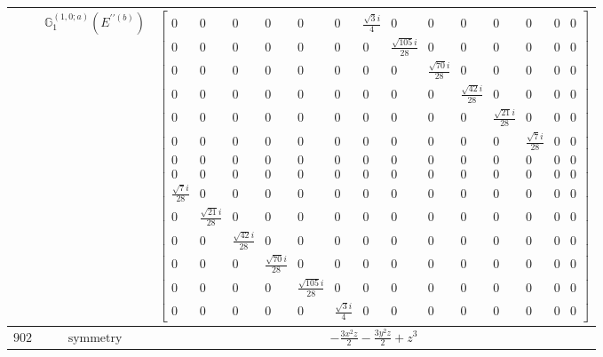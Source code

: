 \documentclass[fleqn,8pt,landscape]{jsarticle}
\begin{document}
\begin{longtable}{ccc}
$  $ & $ \mathbb{G}_{1}^{(1,0;a)}(E^{\prime\prime(b)}) $ & $ \begin{bmatrix} 0 & 0 & 0 & 0 & 0 & 0 & \frac{\sqrt{3} i}{4} & 0 & 0 & 0 & 0 & 0 & 0 & 0 \\ 0 & 0 & 0 & 0 & 0 & 0 & 0 & \frac{\sqrt{105} i}{28} & 0 & 0 & 0 & 0 & 0 & 0 \\ 0 & 0 & 0 & 0 & 0 & 0 & 0 & 0 & \frac{\sqrt{70} i}{28} & 0 & 0 & 0 & 0 & 0 \\ 0 & 0 & 0 & 0 & 0 & 0 & 0 & 0 & 0 & \frac{\sqrt{42} i}{28} & 0 & 0 & 0 & 0 \\ 0 & 0 & 0 & 0 & 0 & 0 & 0 & 0 & 0 & 0 & \frac{\sqrt{21} i}{28} & 0 & 0 & 0 \\ 0 & 0 & 0 & 0 & 0 & 0 & 0 & 0 & 0 & 0 & 0 & \frac{\sqrt{7} i}{28} & 0 & 0 \\ 0 & 0 & 0 & 0 & 0 & 0 & 0 & 0 & 0 & 0 & 0 & 0 & 0 & 0 \\ 0 & 0 & 0 & 0 & 0 & 0 & 0 & 0 & 0 & 0 & 0 & 0 & 0 & 0 \\ \frac{\sqrt{7} i}{28} & 0 & 0 & 0 & 0 & 0 & 0 & 0 & 0 & 0 & 0 & 0 & 0 & 0 \\ 0 & \frac{\sqrt{21} i}{28} & 0 & 0 & 0 & 0 & 0 & 0 & 0 & 0 & 0 & 0 & 0 & 0 \\ 0 & 0 & \frac{\sqrt{42} i}{28} & 0 & 0 & 0 & 0 & 0 & 0 & 0 & 0 & 0 & 0 & 0 \\ 0 & 0 & 0 & \frac{\sqrt{70} i}{28} & 0 & 0 & 0 & 0 & 0 & 0 & 0 & 0 & 0 & 0 \\ 0 & 0 & 0 & 0 & \frac{\sqrt{105} i}{28} & 0 & 0 & 0 & 0 & 0 & 0 & 0 & 0 & 0 \\ 0 & 0 & 0 & 0 & 0 & \frac{\sqrt{3} i}{4} & 0 & 0 & 0 & 0 & 0 & 0 & 0 & 0 \end{bmatrix} $ \\ \hline
$ 902 $ & $ \text{symmetry} $ & $ - \frac{3 x^{2} z}{2} - \frac{3 y^{2} z}{2} + z^{3} $ \\

\end{longtable}
\end{document}
